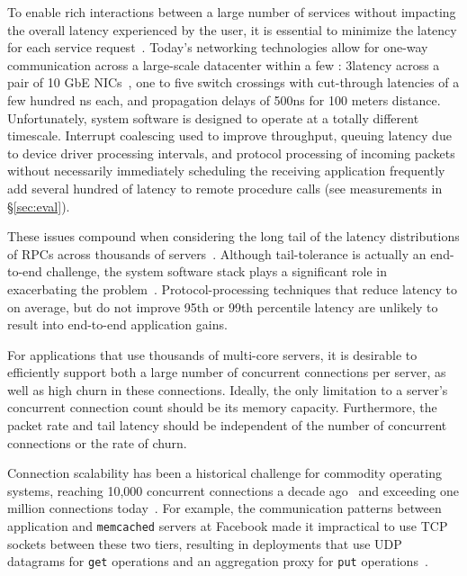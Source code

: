  To enable rich interactions
between a large number of services %
without impacting the overall latency experienced by the user, it is essential
to minimize the latency for each service
request~\cite{luiz-isscc,rumble2011s}. Today's networking technologies
allow for one-way communication across a large-scale datacenter within
a few \microsecond: 3\microsecond latency across a pair of 10 GbE
NICs~\cite{cisco-sereno}, one to five switch crossings with
cut-through latencies of a few hundred ns each, and propagation
delays of 500ns for 100 meters distance. Unfortunately, system
software is designed to operate at a totally different
timescale. Interrupt coalescing used to improve throughput, queuing
latency due to device driver processing intervals, and protocol
processing of incoming packets without necessarily immediately
scheduling the receiving application frequently add several hundred
\microsecond of latency to remote procedure calls (see measurements in
\S\ref{sec:eval}).


These issues compound when considering the long tail of the latency
distributions of RPCs across thousands of
servers~\cite{DBLP:journals/cacm/DeanB13}. Although tail-tolerance is
actually an end-to-end challenge, the system software stack plays a
significant role in exacerbating the problem~\cite{Leverich:RHSU:2014}.
Protocol-processing techniques that reduce latency to \microsecond on
average, but do not improve 95th or 99th percentile latency are
unlikely to result into end-to-end application gains.

 For applications that use thousands of
multi-core servers, it is desirable to efficiently support both a
large number of concurrent connections per server, as well as high
churn in these connections.  Ideally, the only limitation to a
server's concurrent connection count should be its memory capacity. Furthermore,
the packet rate and tail latency should be independent of the number
of concurrent connections or the rate of churn.
 
Connection scalability has been a historical challenge for commodity
operating systems, reaching 10,000 concurrent connections a decade
ago~\cite{theC10Kproblem} and exceeding one million connections
today~\cite{theC10Mproblem}.  For example, the communication patterns
between application and \texttt{memcached} servers at Facebook made it
impractical to use TCP sockets between these two tiers, resulting in
deployments that use UDP datagrams for \texttt{get} operations and an
aggregation proxy for \texttt{put}
operations~\cite{nishtala2013scaling}.

